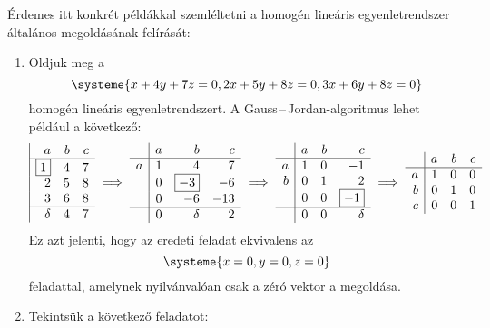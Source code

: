 \documentclass[9pt, a4paper, showtrims]{memoir}
\theoremstyle{plain}
\theoremstyle{remark}
\theoremstyle{definition}
\begin{document}
Érdemes itt konkrét példákkal szemléltetni a homogén lineáris egyenletrendszer általános megoldásának felírását:
\begin{enumerate}
	\item
	      Oldjuk meg a
	      \[
		      \systeme{ x+4y+7z=0,
			      2x+5y+8z=0,
			      3x+6y+8z=0
		      }
	      \]
	      homogén  lineáris egyenletrendszert.
	      A Gauss\,--\,Jordan-algoritmus  lehet például a következő:
	      \[
		      \begin{array}{|rrr}
			      a         & b & c \\
			      \hline
			      \boxed{1} & 4 & 7 \\
			      2         & 5 & 8 \\
			      3         & 6 & 8 \\
			      \hline
			      \delta    & 4 & 7
		      \end{array}
		      \implies
		      \begin{array}{r|rrr}
			        & a & b          & c   \\
			      \hline
			      a & 1 & 4          & 7   \\
			        & 0 & \boxed{-3} & -6  \\
			        & 0 & -6         & -13 \\
			      \hline
			        & 0 & \delta     & 2
		      \end{array}
		      \implies
		      \begin{array}{r|rrr}
			        & a & b & c          \\
			      \hline
			      a & 1 & 0 & -1         \\
			      b & 0 & 1 & 2          \\
			        & 0 & 0 & \boxed{-1} \\
			      \hline
			        & 0 & 0 & \delta
		      \end{array}
		      \implies
		      \begin{array}{r|rrr}
			        & a & b & c \\
			      \hline
			      a & 1 & 0 & 0 \\
			      b & 0 & 1 & 0 \\
			      c & 0 & 0 & 1
		      \end{array}
	      \]
	      Ez azt jelenti, hogy az eredeti feladat ekvivalens az
	      \[\systeme{x=0,y=0,z=0}\]
	      feladattal, amelynek nyilvánvalóan csak a zéró vektor a megoldása.
	\item
	      Tekintsük a következő feladatot:

\end{enumerate}
\end{document}
